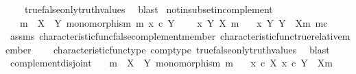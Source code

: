 \begin{isabellebody}
\ \ \ \ true{\isacharunderscore}{\kern0pt}false{\isacharunderscore}{\kern0pt}only{\isacharunderscore}{\kern0pt}truth{\isacharunderscore}{\kern0pt}values\ \isamarkupfalse%
\ blast%
\endisatagproof
{\isafoldproof}%
%
\isadelimproof
\isanewline
%
\endisadelimproof
\isanewline
{}\isamarkupfalse%
\ not{\isacharunderscore}{\kern0pt}in{\isacharunderscore}{\kern0pt}subset{\isacharunderscore}{\kern0pt}in{\isacharunderscore}{\kern0pt}complement{\isacharcolon}{\kern0pt}\isanewline
\ \ \ {\isachardoublequoteopen}m\ {\isacharcolon}{\kern0pt}\ X\ {\isasymrightarrow}\ Y{\isachardoublequoteclose}\ {\isachardoublequoteopen}monomorphism\ m{\isachardoublequoteclose}\ {\isachardoublequoteopen}x\ {\isasymin}\isactrlsub c\ Y{\isachardoublequoteclose}\isanewline
\ \ \ {\isachardoublequoteopen}{\isasymnot}\ x\ {\isasymin}\isactrlbsub Y\isactrlesub \ {\isacharparenleft}{\kern0pt}X{\isacharcomma}{\kern0pt}\ m{\isacharparenright}{\kern0pt}{\isachardoublequoteclose}\isanewline
\ \ \ {\isachardoublequoteopen}x\ {\isasymin}\isactrlbsub Y\isactrlesub \ {\isacharparenleft}{\kern0pt}Y\ {\isasymsetminus}\ {\isacharparenleft}{\kern0pt}X{\isacharcomma}{\kern0pt}m{\isacharparenright}{\kern0pt}{\isacharcomma}{\kern0pt}\ m\isactrlsup c{\isacharparenright}{\kern0pt}{\isachardoublequoteclose}\isanewline
%
\isadelimproof
\ \ %
\endisadelimproof
%
\isatagproof
{}\isamarkupfalse%
\ assms\ characteristic{\isacharunderscore}{\kern0pt}func{\isacharunderscore}{\kern0pt}false{\isacharunderscore}{\kern0pt}complement{\isacharunderscore}{\kern0pt}member\ characteristic{\isacharunderscore}{\kern0pt}func{\isacharunderscore}{\kern0pt}true{\isacharunderscore}{\kern0pt}relative{\isacharunderscore}{\kern0pt}member\isanewline
\ \ \ \ characteristic{\isacharunderscore}{\kern0pt}func{\isacharunderscore}{\kern0pt}type\ comp{\isacharunderscore}{\kern0pt}type\ true{\isacharunderscore}{\kern0pt}false{\isacharunderscore}{\kern0pt}only{\isacharunderscore}{\kern0pt}truth{\isacharunderscore}{\kern0pt}values\ \isamarkupfalse%
\ blast%
\endisatagproof
{\isafoldproof}%
%
\isadelimproof
\isanewline
%
\endisadelimproof
\isanewline
{}\isamarkupfalse%
\ complement{\isacharunderscore}{\kern0pt}disjoint{\isacharcolon}{\kern0pt}\isanewline
\ \ \ {\isachardoublequoteopen}m\ {\isacharcolon}{\kern0pt}\ X\ {\isasymrightarrow}\ Y{\isachardoublequoteclose}\ {\isachardoublequoteopen}monomorphism\ m{\isachardoublequoteclose}\isanewline
\ \ \ {\isachardoublequoteopen}x\ {\isasymin}\isactrlsub c\ X{\isachardoublequoteclose}\ {\isachardoublequoteopen}x{\isacharprime}{\kern0pt}\ {\isasymin}\isactrlsub c\ Y\ {\isasymsetminus}\ {\isacharparenleft}{\kern0pt}X{\isacharcomma}{\kern0pt}m{\isacharparenright}{\kern0pt}{\isachardoublequoteclose}\isanewline

\end{isabellebody}
